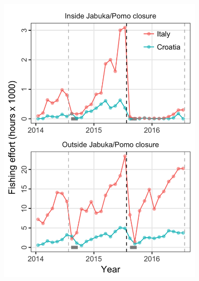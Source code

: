 \documentclass[11pt,]{article}
\begin{document}
\includegraphics[width=0.75000\textwidth]{../ms_1/ms_1_figs/plot_time_series.png}

\newpage
\end{document}

